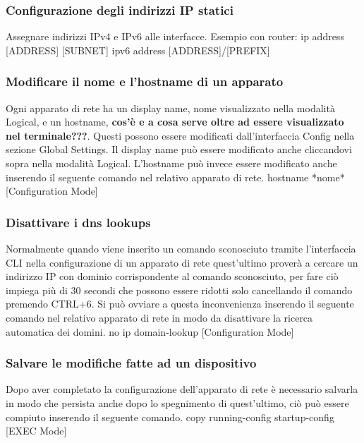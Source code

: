 \subsubsection{Configurazione degli indirizzi IP statici} %
Assegnare indirizzi IPv4 e IPv6 alle interfacce. \newline
Esempio con router: \newline
ip address [ADDRESS] [SUBNET] \newline
ipv6 address [ADDRESS]/[PREFIX]

\subsubsection{Modificare il nome e l'hostname di un apparato} %
Ogni apparato di rete ha un display name, nome visualizzato nella modalità Logical, e un hostname, \textbf{cos'è e a cosa serve oltre ad essere visualizzato nel terminale???}. Questi possono essere modificati dall'interfaccia Config nella sezione Global Settings. Il display name può essere modificato anche cliccandovi sopra nella modalità Logical. L'hostname può invece essere modificato anche inserendo il seguente comando nel relativo apparato di rete.
\newline
\smallskip
\newline
hostname *nome* [Configuration Mode] 

\subsubsection{Disattivare i dns lookups} %
Normalmente quando viene inserito un comando sconosciuto tramite l'interfaccia CLI nella configurazione di un apparato di rete quest'ultimo proverà a cercare un indirizzo IP con dominio corrispondente al comando sconosciuto, per fare ciò impiega più di 30 secondi che possono essere ridotti solo cancellando il comando premendo CTRL+6. Si può ovviare a questa inconvenienza inserendo il seguente comando nel relativo apparato di rete in modo da disattivare la ricerca automatica dei domini. 
\newline
\smallskip
\newline
no ip domain-lookup [Configuration Mode] 

\subsubsection{Salvare le modifiche fatte ad un dispositivo}
Dopo aver completato la configurazione dell'apparato di rete è necessario salvarla in modo che persista anche dopo lo spegnimento di quest'ultimo, ciò può essere compiuto inserendo il seguente comando.  
\newline
\smallskip
\newline
copy running-config startup-config [EXEC Mode]